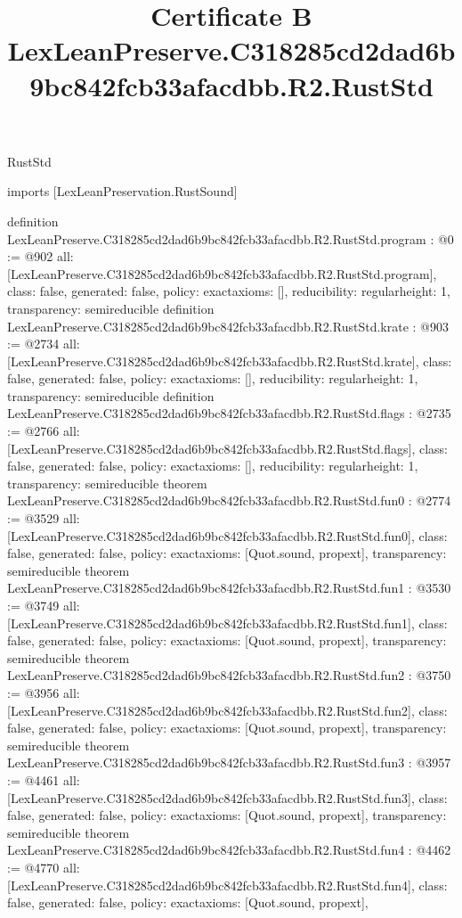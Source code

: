 \begin{lexlean}{RustStd}
\title{Certificate B LexLeanPreserve.C318285cd2dad6b9bc842fcb33afacdbb.R2.RustStd}
\begin{coremodule}
imports [LexLeanPreservation.RustSound]

definition LexLeanPreserve.C318285cd2dad6b9bc842fcb33afacdbb.R2.RustStd.program : @0 := @902 {
  all: [LexLeanPreserve.C318285cd2dad6b9bc842fcb33afacdbb.R2.RustStd.program],
  class: false,
  generated: false,
  policy: exact{axioms: []},
  reducibility: regular{height: 1},
  transparency: semireducible
}
definition LexLeanPreserve.C318285cd2dad6b9bc842fcb33afacdbb.R2.RustStd.krate : @903 := @2734 {
  all: [LexLeanPreserve.C318285cd2dad6b9bc842fcb33afacdbb.R2.RustStd.krate],
  class: false,
  generated: false,
  policy: exact{axioms: []},
  reducibility: regular{height: 1},
  transparency: semireducible
}
definition LexLeanPreserve.C318285cd2dad6b9bc842fcb33afacdbb.R2.RustStd.flags : @2735 := @2766 {
  all: [LexLeanPreserve.C318285cd2dad6b9bc842fcb33afacdbb.R2.RustStd.flags],
  class: false,
  generated: false,
  policy: exact{axioms: []},
  reducibility: regular{height: 1},
  transparency: semireducible
}
theorem LexLeanPreserve.C318285cd2dad6b9bc842fcb33afacdbb.R2.RustStd.fun0 : @2774 := @3529 {
  all: [LexLeanPreserve.C318285cd2dad6b9bc842fcb33afacdbb.R2.RustStd.fun0],
  class: false,
  generated: false,
  policy: exact{axioms: [Quot.sound, propext]},
  transparency: semireducible
}
theorem LexLeanPreserve.C318285cd2dad6b9bc842fcb33afacdbb.R2.RustStd.fun1 : @3530 := @3749 {
  all: [LexLeanPreserve.C318285cd2dad6b9bc842fcb33afacdbb.R2.RustStd.fun1],
  class: false,
  generated: false,
  policy: exact{axioms: [Quot.sound, propext]},
  transparency: semireducible
}
theorem LexLeanPreserve.C318285cd2dad6b9bc842fcb33afacdbb.R2.RustStd.fun2 : @3750 := @3956 {
  all: [LexLeanPreserve.C318285cd2dad6b9bc842fcb33afacdbb.R2.RustStd.fun2],
  class: false,
  generated: false,
  policy: exact{axioms: [Quot.sound, propext]},
  transparency: semireducible
}
theorem LexLeanPreserve.C318285cd2dad6b9bc842fcb33afacdbb.R2.RustStd.fun3 : @3957 := @4461 {
  all: [LexLeanPreserve.C318285cd2dad6b9bc842fcb33afacdbb.R2.RustStd.fun3],
  class: false,
  generated: false,
  policy: exact{axioms: [Quot.sound, propext]},
  transparency: semireducible
}
theorem LexLeanPreserve.C318285cd2dad6b9bc842fcb33afacdbb.R2.RustStd.fun4 : @4462 := @4770 {
  all: [LexLeanPreserve.C318285cd2dad6b9bc842fcb33afacdbb.R2.RustStd.fun4],
  class: false,
  generated: false,
  policy: exact{axioms: [Quot.sound, propext]},
}
\end{coremodule}
\end{lexlean}
